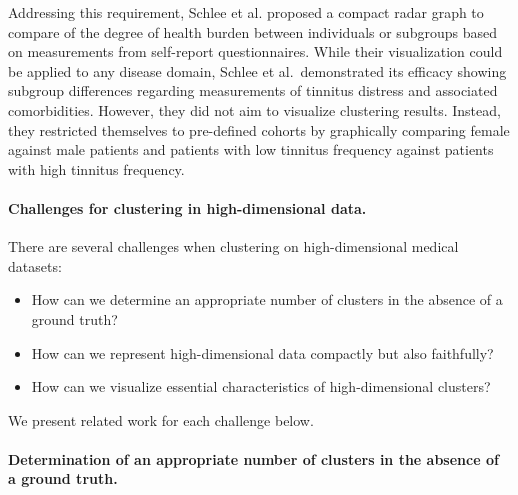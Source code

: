 \documentclass[
  oneside]{book}
\providecommand{\tightlist}{%
  \setlength{\itemsep}{0pt}\setlength{\parskip}{0pt}}
\begin{document}
Addressing this requirement, Schlee et al. \autocite{Schlee:RadarVis2017} proposed a compact radar graph to compare of the degree of health burden between individuals or subgroups based on measurements from self-report questionnaires.
While their visualization could be applied to any disease domain, Schlee et al.~demonstrated its efficacy showing subgroup differences regarding measurements of tinnitus distress and associated comorbidities.
However, they did not aim to visualize clustering results.
Instead, they restricted themselves to pre-defined cohorts by graphically comparing female against male patients and patients with low tinnitus frequency against patients with high tinnitus frequency.

\paragraph*{Challenges for clustering in high-dimensional data.}

There are several challenges when clustering on high-dimensional medical datasets:

\begin{itemize}
\tightlist
\item
  How can we determine an appropriate number of clusters in the absence of a ground truth?
\item
  How can we represent high-dimensional data compactly but also faithfully?
\item
  How can we visualize essential characteristics of high-dimensional clusters?
\end{itemize}

We present related work for each challenge below.

\paragraph*{Determination of an appropriate number of clusters in the absence of a ground truth.}
\end{document}
